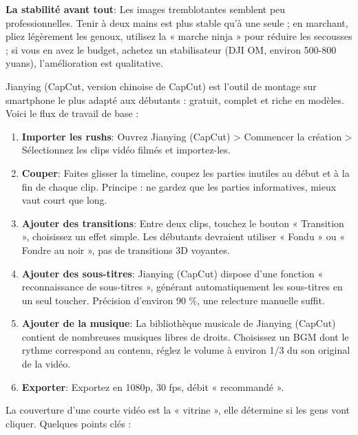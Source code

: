 \textbf{La stabilité avant tout}: Les images tremblotantes semblent peu professionnelles. Tenir à deux mains est plus stable qu'à une seule ; en marchant, pliez légèrement les genoux, utilisez la « marche ninja » pour réduire les secousses ; si vous en avez le budget, achetez un stabilisateur (DJI OM, environ 500-800 yuans), l'amélioration est qualitative.


Jianying (CapCut, version chinoise de CapCut) est l'outil de montage sur smartphone le plus adapté aux débutants : gratuit, complet et riche en modèles. Voici le flux de travail de base :

\begin{enumerate}
  \item \textbf{Importer les rushs}: Ouvrez Jianying (CapCut) > Commencer la création > Sélectionnez les clips vidéo filmés et importez-les.
  \item \textbf{Couper}: Faites glisser la timeline, coupez les parties inutiles au début et à la fin de chaque clip. Principe : ne gardez que les parties informatives, mieux vaut court que long.
  \item \textbf{Ajouter des transitions}: Entre deux clips, touchez le bouton « Transition », choisissez un effet simple. Les débutants devraient utiliser « Fondu » ou « Fondre au noir », pas de transitions 3D voyantes.
  \item \textbf{Ajouter des sous-titres}: Jianying (CapCut) dispose d'une fonction « reconnaissance de sous-titres », générant automatiquement les sous-titres en un seul toucher. Précision d'environ 90 \%, une relecture manuelle suffit.
  \item \textbf{Ajouter de la musique}: La bibliothèque musicale de Jianying (CapCut) contient de nombreuses musiques libres de droits. Choisissez un BGM dont le rythme correspond au contenu, réglez le volume à environ 1/3 du son original de la vidéo.
  \item \textbf{Exporter}: Exportez en 1080p, 30 fps, débit « recommandé ».
\end{enumerate}


La couverture d'une courte vidéo est la « vitrine », elle détermine si les gens vont cliquer. Quelques points clés :

